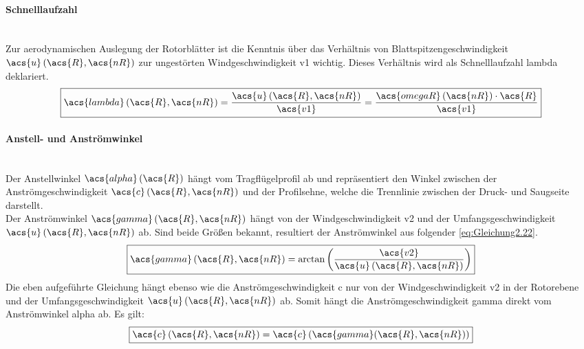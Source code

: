 \paragraph{Schnelllaufzahl}\mbox{}\smallskip\\
Zur aerodynamischen Auslegung der Rotorblätter ist die Kenntnis über das Verhältnis von Blattspitzengeschwindigkeit $\acs{u}\left(\acs{R}, \acs{nR}\right)$ zur ungestörten Windgeschwindigkeit \acs{v1} wichtig. Dieses Verhältnis wird als Schnelllaufzahl \acs{lambda} deklariert.
\begin{equation} \label{eq:Gleichung2.21}
    \boxed{\acs{lambda}\left(\acs{R}, \acs{nR}\right) = \frac{\acs{u}\left(\acs{R}, \acs{nR}\right)}{\acs{v1}} = \frac{\acs{omegaR}\left(\acs{nR}\right) \cdot \acs{R}}{\acs{v1}}}
\end{equation}

\paragraph{Anstell- und Anströmwinkel}\mbox{}\smallskip\\
Der Anstellwinkel $\acs{alpha}\left(\acs{R}\right)$ hängt vom Tragflügelprofil ab und repräsentiert den Winkel zwischen der Anströmgeschwindigkeit $\acs{c}\left(\acs{R}, \acs{nR}\right)$ und der Profilsehne, welche die Trennlinie zwischen der Druck- und Saugseite darstellt.\\
Der Anströmwinkel $\acs{gamma}\left(\acs{R}, \acs{nR}\right)$ hängt von der Windgeschwindigkeit \acs{v2} und der Umfangsgeschwindigkeit $\acs{u}\left(\acs{R}, \acs{nR}\right)$ ab. Sind beide Größen bekannt, resultiert der Anströmwinkel aus folgender \autoref{eq:Gleichung2.22}.
\begin{equation} \label{eq:Gleichung2.22}
	\boxed{\acs{gamma}\left(\acs{R}, \acs{nR}\right) = \arctan\left(\frac{\acs{v2}}{\acs{u}\left(\acs{R}, \acs{nR}\right)}\right)}
\end{equation}
\newline
Die eben aufgeführte Gleichung hängt ebenso wie die Anströmgeschwindigkeit \acs{c} nur von der Windgeschwindigkeit \acs{v2} in der Rotorebene und der Umfangsgeschwindigkeit $\acs{u}\left(\acs{R}, \acs{nR}\right)$ ab. Somit hängt die Anströmgeschwindigkeit \acs{gamma} direkt vom Anströmwinkel \acs{alpha} ab. Es gilt:
\begin{equation} \label{eq:Gleichung2.23}
	\boxed{\acs{c}\left(\acs{R}, \acs{nR}\right) = \acs{c}\left(\acs{gamma}(\acs{R}, \acs{nR})\right)}
\end{equation}

